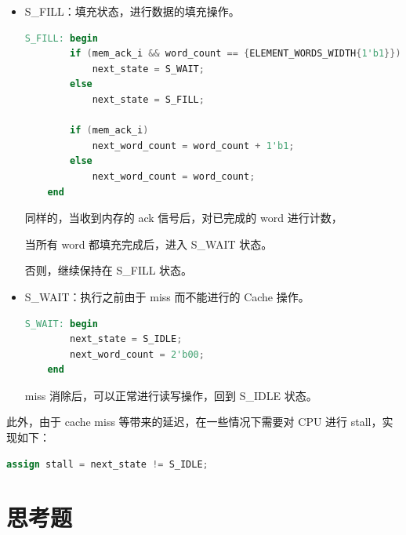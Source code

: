 \documentclass{article}
\begin{document}
\begin{itemize}
    \item S\_FILL：填充状态，进行数据的填充操作。\par
    \begin{lstlisting}[language=Verilog]
    S_FILL: begin
        if (mem_ack_i && word_count == {ELEMENT_WORDS_WIDTH{1'b1}})
            next_state = S_WAIT;
        else
            next_state = S_FILL;

        if (mem_ack_i)
            next_word_count = word_count + 1'b1;
        else
            next_word_count = word_count;
    end
    \end{lstlisting}
    同样的，当收到内存的 ack 信号后，对已完成的 word 进行计数，\par
    当所有 word 都填充完成后，进入 S\_WAIT 状态。\par
    否则，继续保持在 S\_FILL 状态。\par

    \item S\_WAIT：执行之前由于 miss 而不能进行的 Cache 操作。\par
    \begin{lstlisting}[language=Verilog]
    S_WAIT: begin
        next_state = S_IDLE;
        next_word_count = 2'b00;
    end
    \end{lstlisting}
    miss 消除后，可以正常进行读写操作，回到 S\_IDLE 状态。\par
\end{itemize}

此外，由于 cache miss 等带来的延迟，在一些情况下需要对 CPU 进行 stall，实现如下：\par
    \begin{lstlisting}[language=Verilog]
    assign stall = next_state != S_IDLE;
    \end{lstlisting}

\newpage
\section{思考题}
\end{document}
